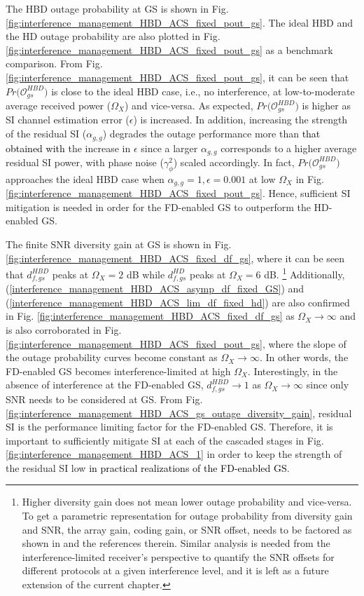 The HBD outage probability at GS is shown in Fig. \ref{fig:interference_management_HBD_ACS_fixed_pout_gs}. The ideal HBD and the HD outage probability are also plotted in Fig. \ref{fig:interference_management_HBD_ACS_fixed_pout_gs} as a benchmark comparison. From Fig. \ref{fig:interference_management_HBD_ACS_fixed_pout_gs}, it can be seen that $Pr\big(\mathcal{O}_{gs}^{HBD}\big)$ is close to the ideal HBD case, i.e., no interference, at low-to-moderate average received power ($\Omega_X$) and vice-versa. As expected, $Pr\big(\mathcal{O}_{gs}^{HBD}\big)$ is higher as SI channel estimation error ($\epsilon$) is increased. In addition, increasing the strength of the residual SI ($\alpha_{g,g}$) degrades the outage performance more than \textcolor{black}{that obtained with} the increase in $\epsilon$ since a larger $\alpha_{g,g}$ corresponds to a higher average residual SI power, with phase noise ($\gamma^2_{\phi}$) scaled accordingly. In fact, $Pr\big(\mathcal{O}_{gs}^{HBD}\big)$ approaches the ideal HBD case when $\alpha_{g,g}=1, \epsilon=0.001$ at low $\Omega_X$ in Fig. \ref{fig:interference_management_HBD_ACS_fixed_pout_gs}. Hence, sufficient SI mitigation is needed in order for the FD-enabled GS to outperform the HD-enabled GS. 

The finite SNR diversity gain at GS is shown in Fig. \ref{fig:interference_management_HBD_ACS_fixed_df_gs}, where it can be seen that $d_{f,gs}^{HBD}$ peaks at $\Omega_X=2$ dB while $d_{f,gs}^{HD}$ peaks at $\Omega_X=6$ dB. \footnote{Higher diversity gain does not mean lower outage probability and vice-versa. To get a parametric representation for outage probability from diversity gain and SNR, the array gain, coding gain, or SNR offset, needs to be factored as shown in \cite{ordonez2012array} and the references therein. Similar analysis is needed from the interference-limited receiver's perspective to quantify the SNR offsets for different protocols at a given interference level, and it is left as a future extension of the current chapter.} Additionally, (\ref{interference_management_HBD_ACS_asymp_df_fixed_GS}) and (\ref{interference_management_HBD_ACS_lim_df_fixed_hd}) are also confirmed in Fig. \ref{fig:interference_management_HBD_ACS_fixed_df_gs} as $\Omega_X \to \infty$ and is also corroborated in Fig. \ref{fig:interference_management_HBD_ACS_fixed_pout_gs}, where the slope of the outage probability curves become constant as $\Omega_X \to \infty$. In other words, the FD-enabled GS becomes interference-limited at high $\Omega_X$. Interestingly, in the absence of interference at the FD-enabled GS, $d_{f,gs}^{HBD} \to 1$ as $\Omega_X \to \infty$ since only SNR needs to be considered at GS. From Fig. \ref{fig:interference_management_HBD_ACS_gs_outage_diversity_gain}, residual SI is the performance limiting factor for the FD-enabled GS. Therefore, it is important to sufficiently mitigate SI at each of the cascaded stages in Fig. \ref{fig:interference_management_HBD_ACS_1} in order to keep the strength of the residual SI low \textcolor{black}{in practical realizations of the FD-enabled GS}.

